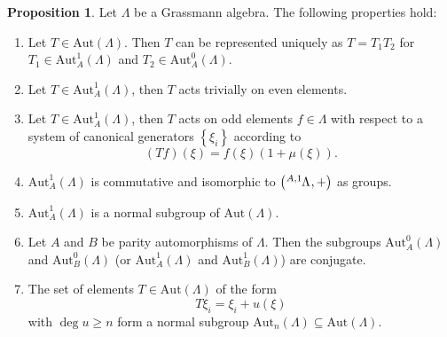 \documentclass{article}
\theoremstyle{definition}
\newtheorem{proposition}{Proposition}
\begin{document}
\begin{proposition}
    Let $\Lambda$ be a Grassmann algebra. The following properties hold:
    \begin{enumerate}
        \item Let $T \in \text{Aut}(\Lambda)$. Then $T$ can be represented uniquely as $T = T_1 T_2$ for $T_1 \in \text{Aut}_A^1(\Lambda)$ and $T_2 \in \text{Aut}_A^0(\Lambda)$.
        \item Let $T \in \text{Aut}_A^1(\Lambda)$, then $T$ acts trivially on even elements.
        \item Let $T \in \text{Aut}_A^1(\Lambda)$, then $T$ acts on odd elements $f \in \Lambda$ with respect to a system of canonical generators $\left\{ \xi_i \right\}$ according to
        \begin{equation*}
            (Tf)(\xi) = f(\xi)(1 + \mu(\xi)).
        \end{equation*}
        \item $\text{Aut}_A^1(\Lambda)$ is commutative and isomorphic to $\left( \tensor[^{A, 1}]{\Lambda}{}, + \right)$ as groups.
        \item $\text{Aut}_A^1(\Lambda)$ is a normal subgroup of $\text{Aut}(\Lambda)$.
        \item Let $A$ and $B$ be parity automorphisms of $\Lambda$. Then the subgroups $\text{Aut}_A^0(\Lambda)$ and $\text{Aut}_B^0(\Lambda)$ (or $\text{Aut}_A^1(\Lambda)$ and $\text{Aut}_B^1(\Lambda)$) are conjugate.
        \item The set of elements $T \in \text{Aut}(\Lambda)$ of the form
        \begin{equation*}
            T \xi_i = \xi_i + u(\xi)
        \end{equation*}
        with $\deg u \geq n$ form a normal subgroup $\text{Aut}_n(\Lambda) \subseteq \text{Aut}(\Lambda)$.
    \end{enumerate}
\end{proposition}
\end{document}
